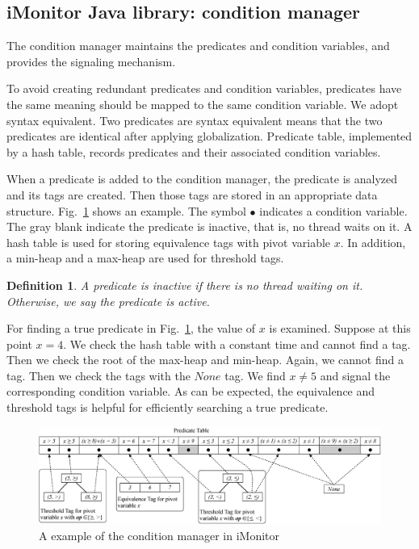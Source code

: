 \documentclass[preprint]{sigplanconf}
\newtheorem{definition}{Definition}
\begin{document}
\subsection{iMonitor Java library: condition manager}
The condition manager maintains the predicates and condition variables, and
provides the signaling mechanism. 

To avoid creating redundant predicates and condition variables, predicates have 
the same meaning should be mapped to the same condition variable. We adopt 
syntax equivalent. Two predicates are syntax equivalent means that the two predicates
are identical after applying globalization. Predicate table, implemented by a
hash table, records predicates and their associated condition variables. 

When a predicate is added to the condition manager, the predicate is analyzed
and its tags are created. Then those tags are stored in an appropriate data
structure. Fig.~\ref{fig:mgr} shows an example. The symbol $\bullet$ indicates 
a condition variable. The gray blank indicate the predicate is inactive,
that is, no thread waits on it. A hash table is used for
storing equivalence tags with pivot variable $x$. In addition, a min-heap and a
max-heap are used for threshold tags. 

\begin{definition}
    A predicate is inactive if there is no thread waiting on it. Otherwise, we
    say the predicate is active.
\end{definition}


For finding a true predicate in Fig.~\ref{fig:mgr}, the value of $x$ is 
examined. Suppose at this point $x=4$. We check the hash table with a
constant time and cannot find a tag. Then we check the root of the max-heap and 
min-heap. Again, we cannot find a tag. Then we check the tags with the $None$
tag. We find $x \ne 5$ and signal the corresponding condition variable. As can
be expected, the equivalence and threshold tags is helpful for efficiently
searching a true predicate.  


\begin{figure}[ht!]
  \centering
  \includegraphics[width=180mm]{fig/manager.eps}
  \caption{A example of the condition manager in iMonitor}
  \label{fig:mgr}
\end{figure}
\end{document}
